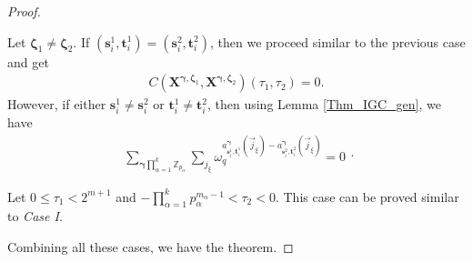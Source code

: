 \documentclass[10pt,a4paper]{amsart}
\theoremstyle{plain}
\begin{document}
\begin{proof}
\begin{mycases}
\begin{mysubcases}
				\item Let $\bm{\zeta}_1 \neq \bm{\zeta}_2$. If $(\mathbf{s}_i^1, \mathbf{t}_i^1)= (\mathbf{s}_i^2, \mathbf{t}_i^2)$, then we  proceed similar to the previous case and get
				\begin{equation}
					\begin{split}
						C\left( \mathbf{X}^{\bm{\gamma},\bm{\zeta}_1}, \mathbf{X}^{\bm{\gamma}, \bm{\zeta}_2} \right) (\tau_1, \tau_2)=0.
					\end{split}
				\end{equation}
				However, if either $\mathbf{s}_i^1 \neq \mathbf{s}_i^2$ or $\mathbf{t}_i^1 \neq \mathbf{t}_i^2$, then using Lemma \ref{Thm_IGC_gen}, we have
				\begin{equation}
					\begin{split}
						\sum_{\bm{\gamma} \prod_{\alpha=1}^{k} \mathbb{Z}_{p_\alpha}}^{ }	\sum_{j_{\xi}}^{} \omega_q^{a_{\mathbf{s}_i^1,\mathbf{t}_i^1}^{\bm{\gamma}} (\vec{j}_{\xi})-a_{\mathbf{s}_i^2,\mathbf{t}_i^2}^{\bm{\gamma}} (\vec{j}_{\xi}) }=0
					\end{split}.
				\end{equation} 
			\end{mysubcases}
			
			\item Let  $0 \leq \tau_1 < 2^{m+1}$ and $ -\prod_{\alpha=1}^{k} p_\alpha^{m_\alpha-1} < \tau_2 < 0$. This case can be proved similar to \textit{Case I}.
		\end{mycases}
		Combining all these cases, we have the theorem.
	\end{proof}
\end{document}
